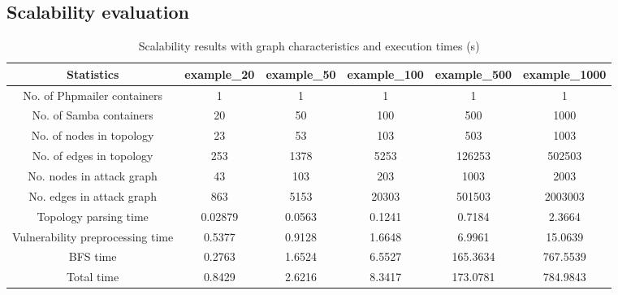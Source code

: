 \subsection{Scalability evaluation}
\label{chap:scalability_eval}


\begin{table*}
	\begin{center}
		\begin{tabular}{ cccccc } 
			\hline
			Statistics & example\_20 & example\_50 & example\_100 & example\_500 & example\_1000 \\ \hline
			
			No. of Phpmailer containers & 1 & 1 & 1 & 1 & 1 \\ 
			
			No. of Samba containers & 20 & 50 & 100 & 500 & 1000 \\ 
			
			No. of nodes in topology & 23 & 53 & 103 & 503 & 1003\\ 
			
			No. of edges in topology & 253 & 1378 & 5253 & 126253 & 502503 \\ 
			
			No. nodes in attack graph & 43 & 103 & 203 & 1003 & 2003 \\ 
			
			No. edges in attack graph & 863 & 5153 & 20303 & 501503 & 2003003 \\ 
			
			Topology parsing time & 0.02879 & 0.0563 & 0.1241 & 0.7184 & 2.3664 \\ 
			
			Vulnerability preprocessing time & 0.5377 & 0.9128 & 1.6648 & 6.9961 & 15.0639 \\ 
			
			BFS time & 0.2763 & 1.6524 & 6.5527 & 165.3634 & 767.5539 \\ 
			
			Total time & 0.8429 & 2.6216 & 8.3417 & 173.0781 & 784.9843 \\ 
			\hline
		\end{tabular}
	\end{center}
	
	\caption{Scalability results with graph characteristics and execution times (s)}
	
	\label{table_scalability}
\end{table*}
